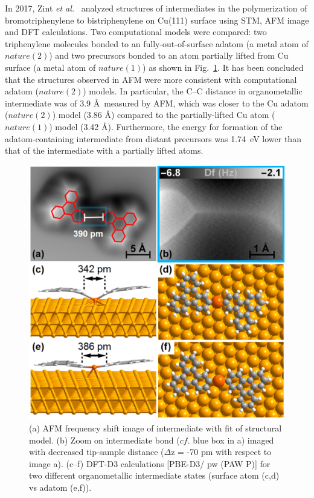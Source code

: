 \documentclass[%
 reprint,
 amsmath,amssymb,
 aps,
prb,
]{revtex4-2}
\begin{document}
In 2017, Zint \textit{et al.}~\cite{acsnano2017} analyzed structures of intermediates in the polymerization of bromotriphenylene to bistriphenylene on Cu(111) surface using STM, AFM image and DFT calculations. Two computational models were compared: two triphenylene molecules bonded to an fully-out-of-surface adatom (a metal atom of $nature(2)$) and two precursors bonded to an atom partially lifted from Cu surface (a metal atom of $nature(1)$) as shown in Fig.~\ref{fig:5}. It has been concluded that the structures observed in AFM were more consistent with computational adatom ($nature(2)$) models. In particular, the C--C distance in organometallic intermediate was of 3.9 \AA\ measured by AFM, which was closer to the Cu adatom ($nature(2)$) model (3.86 \AA) compared to the partially-lifted Cu atom ($nature(1)$) model (3.42 \AA). Furthermore, the energy for formation of the adatom-containing intermediate from distant precursors was 1.74~eV lower than that of the intermediate with a partially lifted atoms. 
\begin{figure}[hbt]
\centering
\includegraphics[width=0.75\columnwidth]{Fig/distance.png}
\caption{(a) AFM frequency shift image of intermediate with fit of structural model. (b) Zoom on intermediate bond ($cf$. blue box in a) imaged with decreased tip-sample distance ($\Delta$z = -70 pm with respect to image a). (c--f) DFT-D3 calculations [PBE-D3/ pw (PAW P)] for two different organometallic intermediate states (surface atom (c,d) vs adatom (e,f)).}
\label{fig:5}
\end{figure}
\end{document}
